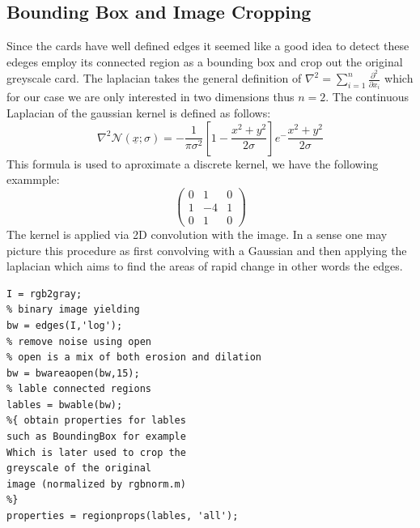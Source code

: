 \documentclass[11pt]{article}
\theoremstyle{plain}
\theoremstyle{definition}
\begin{document}
\subsection{Bounding Box and Image Cropping}
Since the cards have well defined edges it seemed like a good idea to detect these edeges
employ its connected region as a bounding box and crop out the original greyscale card.
\newline
\newline
The laplacian takes the general definition of $\nabla^{2} = \sum_{i=1}^{n}\frac{\partial^2}{\partial x_{i}}$ which for our case we are only interested in two dimensions thus $n=2$.
The continuous Laplacian of the gaussian kernel is defined as follows:
\begin{equation*}
\nabla^{2}\mathcal{N}(\underline{x};\sigma)= -\frac{1}{\pi \sigma^{2}}\left[ 1 -\frac{x^{2} + y^{2}}{2\sigma}\right]e^-\frac{x^{2} + y^{2} }{2\sigma}
\end{equation*}
This formula is used to aproximate a discrete kernel, we have the following exammple:
\[
\begin{pmatrix}
  0 & 1 & 0 \\
  1 & -4 & 1 \\
  0 & 1 & 0
 \end{pmatrix}
\]
The kernel is applied via 2D convolution with the image. In a sense one may picture this procedure as first convolving with a Gaussian and then applying the laplacian which aims to find the areas of rapid change in other words the edges.
\newline
\newline
\begin{lstlisting}
I = rgb2gray;
% binary image yielding 
bw = edges(I,'log');
% remove noise using open
% open is a mix of both erosion and dilation
bw = bwareaopen(bw,15);
% lable connected regions
lables = bwable(bw);
%{ obtain properties for lables
such as BoundingBox for example
Which is later used to crop the 
greyscale of the original 
image (normalized by rgbnorm.m)
%}
properties = regionprops(lables, 'all');
\end{lstlisting}
\end{document}
